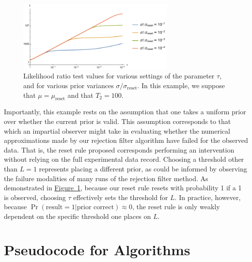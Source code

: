 \documentclass[aps,pra,amsmath,twocolumn,amssymb,superscriptaddress]{revtex4-1}
\newcommand{\reset}{\mathrm{reset}}
\newcommand{\fig}[1]{\hyperref[fig:#1]{Figure~\ref*{fig:#1}}}
\begin{document}
\begin{figure}
    \begin{center}
        \includegraphics[width=0.7\textwidth]{reset-bf-thresholds.pdf}
    \end{center}
    \caption{
        \label{fig:reset-bf-thresholds}
        Likelihood ratio test values for various settings of the parameter
        $\tau$, and for various prior variances $\sigma / \sigma_\reset$.
        In this example, we suppose that $\mu = \mu_\reset$ and that $T_2 = 100$.
    }
\end{figure}

Importantly, this example rests on the assumption that one takes a uniform
prior over whether the current prior is valid. This assumption corresponds to
that which an impartial observer might take in evaluating whether the numerical
approximations made by our rejection filter algorithm have failed for the
observed data. That is, the reset rule proposed corresponds performing an intervention
without relying on the full experimental data record. Choosing a threshold
other than $L = 1$ represents placing a different prior, as could be informed by observing
the failure modalities of many runs of the rejection filter method. As
demonstrated in \fig{reset-bf-thresholds}, because our reset rule resets with
probability 1 if a 1 is observed, choosing $\tau$ effectively sets the threshold
for $L$.
In practice,
however, because $\Pr(\text{result} = 1 | \text{prior correct}) \approx 0$, the reset
rule is only weakly dependent on the specific threshold one places on $L$.


\section{Pseudocode for Algorithms}
\label{app:pseudocode}
\end{document}

